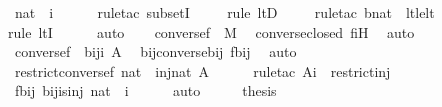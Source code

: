 \begin{isabellebody}
\ {\isachardoublequoteopen}nat\ {\isasymsubseteq}\ i{\isachardoublequoteclose}\ \isanewline
\ \ \ \ \isamarkupfalse%
{\isacharparenleft}{\kern0pt}rule{\isacharunderscore}{\kern0pt}tac\ subsetI{\isacharparenright}{\kern0pt}\isanewline
\ \ \ \ \isamarkupfalse%
{\isacharparenleft}{\kern0pt}rule\ ltD{\isacharparenright}{\kern0pt}\isanewline
\ \ \ \ \isamarkupfalse%
{\isacharparenleft}{\kern0pt}rule{\isacharunderscore}{\kern0pt}tac\ b{\isacharequal}{\kern0pt}nat\ \ lt{\isacharunderscore}{\kern0pt}le{\isacharunderscore}{\kern0pt}lt{\isacharparenright}{\kern0pt}\isanewline
\ \ \ \ \ \isamarkupfalse%
{\isacharparenleft}{\kern0pt}rule\ ltI{\isacharparenright}{\kern0pt}\isanewline
\ \ \ \ \isamarkupfalse%
\ auto\isanewline
\isanewline
\ \ \isamarkupfalse%
\ {\isachardoublequoteopen}converse{\isacharparenleft}{\kern0pt}f{\isacharparenright}{\kern0pt}\ {\isasymin}\ M{\isachardoublequoteclose}\ \isamarkupfalse%
\ converse{\isacharunderscore}{\kern0pt}closed\ fiH\ \isamarkupfalse%
\ auto\isanewline
\ \ \isamarkupfalse%
\ {\isachardoublequoteopen}converse{\isacharparenleft}{\kern0pt}f{\isacharparenright}{\kern0pt}\ {\isasymin}\ bij{\isacharparenleft}{\kern0pt}i{\isacharcomma}{\kern0pt}\ A{\isacharparenright}{\kern0pt}{\isachardoublequoteclose}\ \isamarkupfalse%
\ bij{\isacharunderscore}{\kern0pt}converse{\isacharunderscore}{\kern0pt}bij\ fbij\ \isamarkupfalse%
\ auto\ \isanewline
\isanewline
\ \ \isamarkupfalse%
\ \isamarkupfalse%
\ {\isachardoublequoteopen}restrict{\isacharparenleft}{\kern0pt}converse{\isacharparenleft}{\kern0pt}f{\isacharparenright}{\kern0pt}{\isacharcomma}{\kern0pt}\ nat{\isacharparenright}{\kern0pt}\ {\isasymin}\ inj{\isacharparenleft}{\kern0pt}nat{\isacharcomma}{\kern0pt}\ A{\isacharparenright}{\kern0pt}{\isachardoublequoteclose}\ \isanewline
\ \ \ \ \isamarkupfalse%
{\isacharparenleft}{\kern0pt}rule{\isacharunderscore}{\kern0pt}tac\ A{\isacharequal}{\kern0pt}i\ \ restrict{\isacharunderscore}{\kern0pt}inj{\isacharparenright}{\kern0pt}\isanewline
\ \ \ \ \isamarkupfalse%
\ fbij\ bij{\isacharunderscore}{\kern0pt}is{\isacharunderscore}{\kern0pt}inj\ {\isacartoucheopen}nat\ {\isasymsubseteq}\ i{\isacartoucheclose}\isanewline
\ \ \ \ \isamarkupfalse%
\ auto\isanewline
\ \ \isamarkupfalse%
\ \isamarkupfalse%
\ {\isacharquery}{\kern0pt}thesis\ \isanewline

\end{isabellebody}
